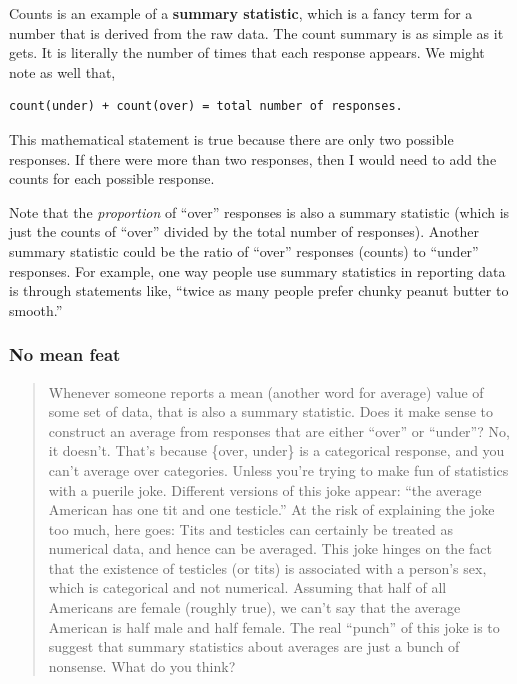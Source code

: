 \documentclass[openany]{book}
\begin{document}
Counts is an example of a \textbf{summary statistic}, which is a fancy term for a number that is derived from the raw data. The count summary is as simple as it gets. It is literally the number of times that each response appears. We might note as well that,

\begin{verbatim}
count(under) + count(over) = total number of responses.
\end{verbatim}

This mathematical statement is true because there are only two possible responses. If there were more than two responses, then I would need to add the counts for each possible response.

Note that the \emph{proportion} of ``over'' responses is also a summary statistic (which is just the counts of ``over'' divided by the total number of responses). Another summary statistic could be the ratio of ``over'' responses (counts) to ``under'' responses. For example, one way people use summary statistics in reporting data is through statements like, ``twice as many people prefer chunky peanut butter to smooth.''

\hypertarget{no-mean-feat}{%
\subsubsection*{No mean feat}\label{no-mean-feat}}

\begin{quote}
Whenever someone reports a mean (another word for average) value of some set of data, that is also a summary statistic. Does it make sense to construct an average from responses that are either ``over'' or ``under''? No, it doesn't. That's because \{over, under\} is a categorical response, and you can't average over categories. Unless you're trying to make fun of statistics with a puerile joke. Different versions of this joke appear: ``the average American has one tit and one testicle.'' At the risk of explaining the joke too much, here goes: Tits and testicles can certainly be treated as numerical data, and hence can be averaged. This joke hinges on the fact that the existence of testicles (or tits) is associated with a person's sex, which is categorical and not numerical. Assuming that half of all Americans are female (roughly true), we can't say that the average American is half male and half female. The real ``punch'' of this joke is to suggest that summary statistics about averages are just a bunch of nonsense. What do you think?
\end{quote}
\end{document}
